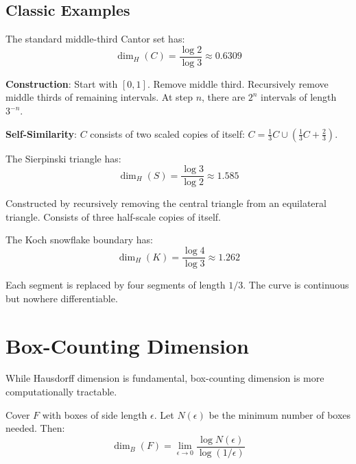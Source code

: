 \subsection{Classic Examples}

\begin{example}
The standard middle-third Cantor set has:
\begin{equation}
    \dim_H(C) = \frac{\log 2}{\log 3} \approx 0.6309
\end{equation}

\textbf{Construction}: Start with $[0,1]$. Remove middle third. Recursively remove middle thirds of remaining intervals. At step $n$, there are $2^n$ intervals of length $3^{-n}$.

\textbf{Self-Similarity}: $C$ consists of two scaled copies of itself: $C = \frac{1}{3}C \cup (\frac{1}{3}C + \frac{2}{3})$.
\end{example}

\begin{example}
The Sierpinski triangle has:
\begin{equation}
    \dim_H(S) = \frac{\log 3}{\log 2} \approx 1.585
\end{equation}

Constructed by recursively removing the central triangle from an equilateral triangle. Consists of three half-scale copies of itself.
\end{example}

\begin{example}
The Koch snowflake boundary has:
\begin{equation}
    \dim_H(K) = \frac{\log 4}{\log 3} \approx 1.262
\end{equation}

Each segment is replaced by four segments of length $1/3$. The curve is continuous but nowhere differentiable.
\end{example}

\section{Box-Counting Dimension}

While Hausdorff dimension is fundamental, box-counting dimension is more computationally tractable.

\begin{definition}
Cover $F$ with boxes of side length $\epsilon$. Let $N(\epsilon)$ be the minimum number of boxes needed. Then:
\begin{equation}
    \dim_B(F) = \lim_{\epsilon \to 0} \frac{\log N(\epsilon)}{\log(1/\epsilon)}
\end{equation}
\end{definition}

